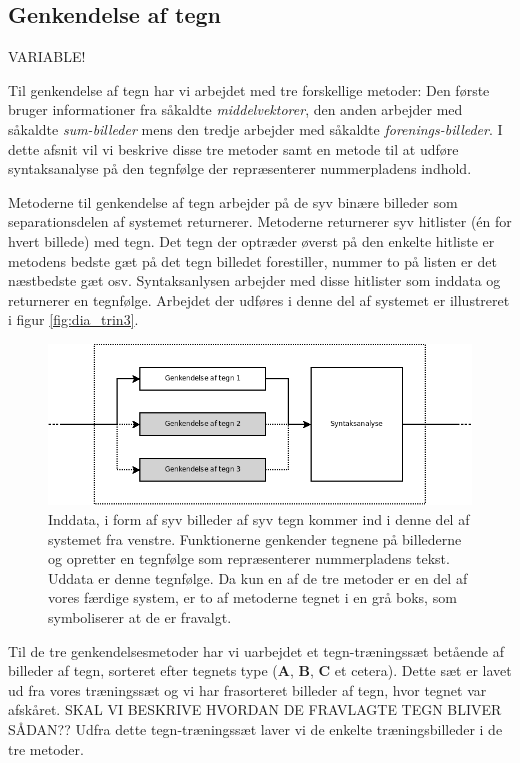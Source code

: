 \subsection{Genkendelse af tegn}
\label{sec_monster}

VARIABLE!

Til genkendelse af tegn har vi arbejdet med tre forskellige metoder: Den første bruger informationer fra såkaldte \textit{middelvektorer}, den anden arbejder med såkaldte \textit{sum-billeder} mens den tredje arbejder med såkaldte \textit{forenings-billeder}. I dette afsnit vil vi beskrive disse tre metoder samt en metode til at udføre syntaksanalyse på den tegnfølge der repræsenterer nummerpladens indhold.

Metoderne til genkendelse af tegn arbejder på de syv binære billeder som separationsdelen af systemet returnerer. Metoderne returnerer syv hitlister (én for hvert billede) med tegn. Det tegn der optræder øverst på den enkelte hitliste er metodens bedste gæt på det tegn billedet forestiller, nummer to på listen er det næstbedste gæt osv. Syntaksanlysen arbejder med disse hitlister som inddata og returnerer en tegnfølge. Arbejdet der udføres i denne del af systemet er illustreret i figur \vref{fig:dia_trin3}.

\begin{figure}[htp]
\centering
\includegraphics[width=12cm]{system/illu/dia_trin3.png} 
\caption{Inddata, i form af syv billeder af syv tegn kommer ind i denne del af systemet fra venstre. Funktionerne genkender tegnene på billederne og opretter en tegnfølge som repræsenterer nummerpladens tekst. Uddata er denne tegnfølge. Da kun en af de tre metoder er en del af vores færdige system, er to af metoderne tegnet i en grå boks, som symboliserer at de er fravalgt.}
\label{fig:dia_trin3}
\end{figure}

Til de tre genkendelsesmetoder har vi uarbejdet et tegn-træningssæt betående af billeder af tegn, sorteret efter tegnets type (\textbf{A}, \textbf{B}, \textbf{C} et cetera). Dette sæt er lavet ud fra vores træningssæt og vi har frasorteret billeder af tegn, hvor tegnet var afskåret. SKAL VI BESKRIVE HVORDAN DE FRAVLAGTE TEGN BLIVER SÅDAN?? Udfra dette tegn-træningssæt laver vi de enkelte træningsbilleder i de tre metoder.

